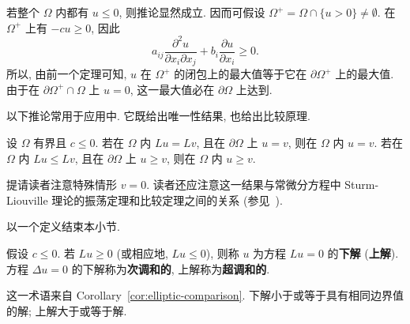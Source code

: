 \begin{Proof}
若整个 $\Omega$ 内都有 $u\leq0$, 则推论显然成立. 因而可假设 $\Omega^+=\Omega\cap\{u>0\}\ne\emptyset$. 在 $\Omega^+$ 上有 $-cu\geq0$, 因此
\begin{equation}\label{eq:positive-set-zero-order-free-inequality}
a_{ij}\dfrac{\partial^2u}{\partial x_i\partial x_j}+b_i\dfrac{\partial u}{\partial x_i}\geq0.
\end{equation}
所以, 由前一个定理可知, $u$ 在 $\Omega^+$ 的闭包上的最大值等于它在 $\partial\Omega^+$ 上的最大值. 由于在 $\partial\Omega^+\cap\Omega$ 上 $u=0$, 这一最大值必在 $\partial\Omega$ 上达到.
\end{Proof}

以下推论常用于应用中. 它既给出唯一性结果, 也给出比较原理.

\begin{Corollary}
\label{cor:elliptic-comparison}
设 $\Omega$ 有界且 $c\leq0$. 若在 $\Omega$ 内 $Lu=Lv$, 且在 $\partial\Omega$ 上 $u=v$, 则在 $\Omega$ 内 $u=v$. 若在 $\Omega$ 内 $Lu\leq Lv$, 且在 $\partial\Omega$ 上 $u\geq v$, 则在 $\Omega$ 内 $u\geq v$.
\end{Corollary}

\begin{Remark}
\label{rem:elliptic-comparison-sturm-liouville}
提请读者注意特殊情形 $v=0$. 读者还应注意这一结果与常微分方程中 Sturm-Liouville 理论的振荡定理和比较定理之间的关系 (参见~\cite{In}).
\end{Remark}

以一个定义结束本小节.

\begin{Definition}
\label{def:elliptic-subsolution}
假设 $c\leq0$. 若 $Lu\geq0$ (或相应地, $Lu\leq0$), 则称 $u$ 为方程 $Lu=0$ 的\textbf{下解} (\textbf{上解}). 方程 $\Delta u=0$ 的下解称为\textbf{次调和的}, 上解称为\textbf{超调和的}.
\end{Definition}

这一术语来自 Corollary~\ref{cor:elliptic-comparison}. 下解小于或等于具有相同边界值的解; 上解大于或等于解.

